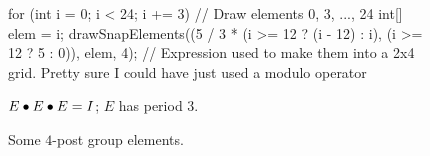 \documentclass[../textbook.tex]{subfiles}
\begin{document}
\begin{figure}[h]
\begin{center}
\begin{minipage}[b]{.45\textwidth}
\begin{asy}[width=0.7\textwidth]
			for (int i = 0; i < 24; i += 3) { // Draw elements 0, 3, ..., 24
			int[] elem = {i};
			drawSnapElements((5 / 3 * (i >= 12 ? (i - 12) : i), (i >= 12 ? 5 : 0)), elem, 4); // Expression used to make them into a 2x4 grid. Pretty sure I could have just used a modulo operator
			}
			\end{asy}
		\end{minipage}
	\end{center}
	\vspace*{-2\baselineskip}
	\begin{center}
		\begin{minipage}[t]{.45\textwidth}
			\caption{$E\bullet E\bullet E = I$; $E$ has period $3$.}
			\label{fig:eper3}
		\end{minipage}
		\begin{minipage}[t]{.45\textwidth}
			\caption{Some $4$-post group elements.}
			\label{fig:fpge}
		\end{minipage}
	\end{center}
	\vspace*{-2\baselineskip}
\end{figure}
\end{document}
